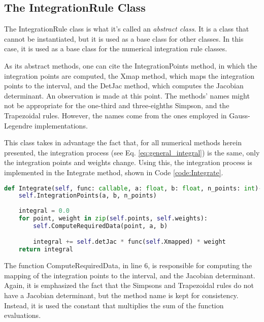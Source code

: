 \subsection{The IntegrationRule Class}
The IntegrationRule class is what it's called an \textit{abstract class}. It is a class that cannot be instantiated, but it is used as a base class for other classes. In this case, it is used as a base class for the numerical integration rule classes. 

As its abstract methods, one can cite the IntegrationPoints method, in which the integration points are computed, the Xmap method, which maps the integration points to the interval, and the DetJac method, which computes the Jacobian determinant. An observation is made at this point. The methods' names might not be appropriate for the one-third and three-eighths Simpson, and the Trapezoidal rules. However, the names come from the ones employed in Gauss-Legendre implementations. 

This class takes in advantage the fact that, for all numerical methods herein presented, the integration process (see Eq. \eqref{eq:general_integral}) is the same, only the integration points and weights change. Using this, the integration process is implemented in the Integrate method, shown in Code \ref{code:Integrate}.
\begin{lstlisting}[language=python, caption={Integrate Method.}, label={code:Integrate}]
def Integrate(self, func: callable, a: float, b: float, n_points: int)->float:
    self.IntegrationPoints(a, b, n_points)
    
    integral = 0.0
    for point, weight in zip(self.points, self.weights):
        self.ComputeRequiredData(point, a, b)

        integral += self.detJac * func(self.Xmapped) * weight 
    return integral
\end{lstlisting}

The function ComputeRequiredData, in line 6, is responsible for computing the mapping of the integration points to the interval, and the Jacobian determinant. Again, it is emphasized the fact that the Simpsons and Trapezoidal rules do not have a Jacobian determinant, but the method name is kept for consistency. Instead, it is used the constant that multiplies the sum of the function evaluations. 

